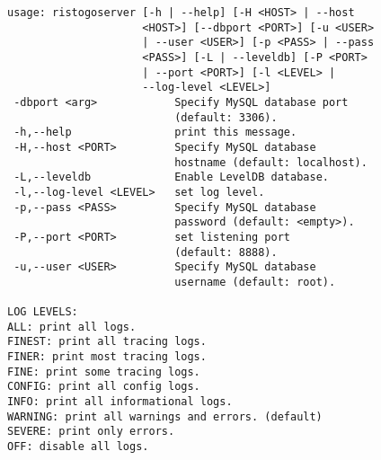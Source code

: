 \begin{verbatim}
usage: ristogoserver [-h | --help] [-H <HOST> | --host
                     <HOST>] [--dbport <PORT>] [-u <USER>
                     | --user <USER>] [-p <PASS> | --pass
                     <PASS>] [-L | --leveldb] [-P <PORT>
                     | --port <PORT>] [-l <LEVEL> |
                     --log-level <LEVEL>]
 -dbport <arg>            Specify MySQL database port
                          (default: 3306).
 -h,--help                print this message.
 -H,--host <PORT>         Specify MySQL database
                          hostname (default: localhost).
 -L,--leveldb             Enable LevelDB database.
 -l,--log-level <LEVEL>   set log level.
 -p,--pass <PASS>         Specify MySQL database
                          password (default: <empty>).
 -P,--port <PORT>         set listening port
                          (default: 8888).
 -u,--user <USER>         Specify MySQL database
                          username (default: root).

LOG LEVELS:
ALL: print all logs.
FINEST: print all tracing logs.
FINER: print most tracing logs.
FINE: print some tracing logs.
CONFIG: print all config logs.
INFO: print all informational logs.
WARNING: print all warnings and errors. (default)
SEVERE: print only errors.
OFF: disable all logs.
\end{verbatim}
